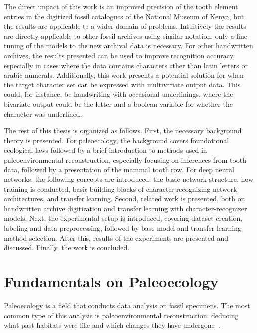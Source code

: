 \documentclass[english,twoside,openright]{UH_DS_MSc}
\begin{document}
The direct impact of this work is an improved precision of the tooth element entries in the digitized 
fossil catalogues of the National Museum of Kenya, but the results are applicable to a wider domain of problems.
Intuitively the results are directly applicable to other fossil archives using similar notation: only a fine-tuning of the 
models to the new archival data is necessary.
For other handwritten archives, the results presented can be used to improve recognition accuracy, especially in cases 
where the data contains characters other than latin letters or arabic numerals. Additionally, this work presents
a potential solution for when the target character set can be expressed with multivariate output data. This could, for 
instance, be handwriting with occasional underlinings, where the bivariate output could be the letter and a boolean variable for 
whether the character was underlined.

The rest of this thesis is organized as follows. First, the necessary background theory is 
presented. For paleoecology, the background covers 
foundational ecological laws followed by a brief introduction to methods used in
paleoenvironmental reconstruction, especially focusing on inferences from tooth data,
followed by a presentation of the mammal tooth row.
For deep neural networks, the following concepts are introduced:
the basic network structure, how training is conducted, basic building blocks of character-recognizing network architectures, and transfer learning. 
Second, related work is presented, both on
handwritten archive digitization and transfer learning with character-recognizer models.
Next, the experimental setup is introduced, covering dataset creation, labeling and data 
preprocessing, followed by base model and transfer learning method selection. After this, 
results of the experiments are presented and discussed. Finally, the work is concluded.

\chapter{Fundamentals on Paleoecology}

Paleoecology is a field that conducts data analysis on fossil specimens. The most common type of 
this analysis is paleoenvironmental reconstruction: deducing what past habitats were like and which 
changes they have undergone~\cite{Faith_Lyman_2019}.
\end{document}
